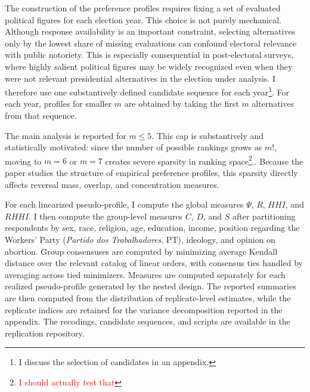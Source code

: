 \documentclass[12pt]{article}
\begin{document}
The construction of the preference profiles requires fixing a set of evaluated
political figures for each election year. This choice is not purely mechanical.
Although response availability is an important constraint, selecting
alternatives only by the lowest share of missing evaluations can confound
electoral relevance with public notoriety. This is especially consequential in
post-electoral surveys, where highly salient political figures may be widely
recognized even when they were not relevant presidential alternatives in the
election under analysis. I therefore use one substantively defined candidate
sequence for each year\footnote{I discuss the selection of candidates in an appendix.}. For each year, profiles for smaller \(m\) are obtained
by taking the first \(m\) alternatives from that sequence.


The main analysis is reported for \(m \leq 5\). This cap is substantively and
statistically motivated: since the number of possible rankings grows as \(m!\),
moving to \(m=6\) or \(m=7\) creates severe sparsity in ranking
space\footnote{\textcolor{red}{I should actually test that}}.. Because the paper
studies the structure of empirical preference profiles, this sparsity directly
affects reversal mass, overlap, and concentration measures.

For each linearized pseudo-profile, I compute the global measures \(\Psi\),
\(R\), \(HHI\), and \(RHHI\). I then compute the group-level measures \(C\),
\(D\), and \(S\) after partitioning respondents by sex, race, religion, age,
education, income, position regarding the Workers' Party (\textit{Partido dos
Trabalhadores}, PT), ideology, and opinion on abortion. Group consensuses are
computed by minimizing average Kendall distance over the relevant catalog of
linear orders, with consensus ties handled by averaging across tied minimizers.
Measures are computed separately for each realized pseudo-profile generated by
the nested design. The reported summaries are then computed from the
distribution of replicate-level estimates, while the replicate indices are
retained for the variance decomposition reported in the appendix. The
recodings, candidate sequences, and scripts are available in the replication
repository.
\end{document}
